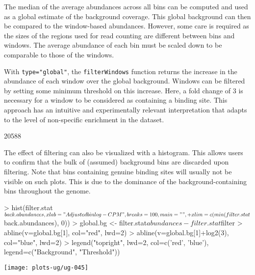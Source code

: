 \documentclass[12pt]{report}
\renewenvironment{Schunk}{\vspace{0pt}}{\vspace{0pt}}
\newcommand{\code}[1]{{\small\texttt{#1}}}
\begin{document}
The median of the average abundances across all bins can be computed and used as a global estimate of the background coverage.
This global background can then be compared to the window-based abundances.
However, some care is required as the sizes of the regions used for read counting are different between bins and windows.
The average abundance of each bin must be scaled down to be comparable to those of the windows.

With \code{type="global"}, the \code{filterWindows} function returns the increase in the abundance of each window over the global background.
Windows can be filtered by setting some minimum threshold on this increase.
Here, a fold change of 3 is necessary for a window to be considered as containing a binding site. 
This approach has an intuitive and experimentally relevant interpretation that adapts to the level of non-specific enrichment in the dataset. 

\begin{Schunk}
\begin{Soutput}
[1] 20588
\end{Soutput}
\end{Schunk}

The effect of filtering can also be visualized with a histogram. 
This allows users to confirm that the bulk of (assumed) background bins are discarded upon filtering. 
Note that bins containing genuine binding sites will usually not be visible on such plots.
This is due to the dominance of the background-containing bins throughout the genome.

\begin{Schunk}
\begin{Sinput}
> hist(filter.stat$back.abundances, xlab="Adjusted bin log-CPM", breaks=100, main="", 
+     xlim=c(min(filter.stat$back.abundances), 0))
> global.bg <- filter.stat$abundances - filter.stat$filter
> abline(v=global.bg[1], col="red", lwd=2)
> abline(v=global.bg[1]+log2(3), col="blue", lwd=2)
> legend("topright", lwd=2, col=c('red', 'blue'), legend=c("Background", "Threshold"))
\end{Sinput}
\end{Schunk}

\begin{center}
\texttt{[image: plots-ug/ug-045]}
\end{center}
\end{document}
